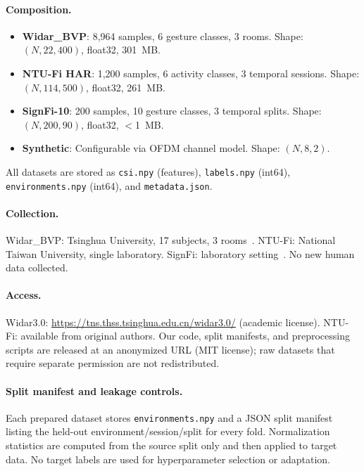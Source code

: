 \paragraph{Composition.}
\begin{itemize}
    \item \textbf{Widar\_BVP}: 8,964 samples, 6 gesture classes, 3 rooms. Shape: $(N, 22, 400)$, float32, 301~MB.
    \item \textbf{NTU-Fi HAR}: 1,200 samples, 6 activity classes, 3 temporal sessions. Shape: $(N, 114, 500)$, float32, 261~MB.
    \item \textbf{SignFi-10}: 200 samples, 10 gesture classes, 3 temporal splits. Shape: $(N, 200, 90)$, float32, $<$1~MB.
    \item \textbf{Synthetic}: Configurable via OFDM channel model. Shape: $(N, 8, 2)$.
\end{itemize}

All datasets are stored as \texttt{csi.npy} (features), \texttt{labels.npy} (int64), \texttt{environments.npy} (int64), and \texttt{metadata.json}.

\paragraph{Collection.} Widar\_BVP: Tsinghua University, 17 subjects, 3 rooms~\cite{zheng2019widar}. NTU-Fi: National Taiwan University, single laboratory. SignFi: laboratory setting~\cite{ma2018signfi}. No new human data collected.

\paragraph{Access.} Widar3.0: \url{https://tns.thss.tsinghua.edu.cn/widar3.0/} (academic license). NTU-Fi: available from original authors. Our code, split manifests, and preprocessing scripts are released at an anonymized URL (MIT license); raw datasets that require separate permission are not redistributed.

\paragraph{Split manifest and leakage controls.} Each prepared dataset stores
\texttt{environments.npy} and a JSON split manifest listing the held-out
environment/session/split for every fold. Normalization statistics are computed
from the source split only and then applied to target data. No target labels are
used for hyperparameter selection or adaptation.

